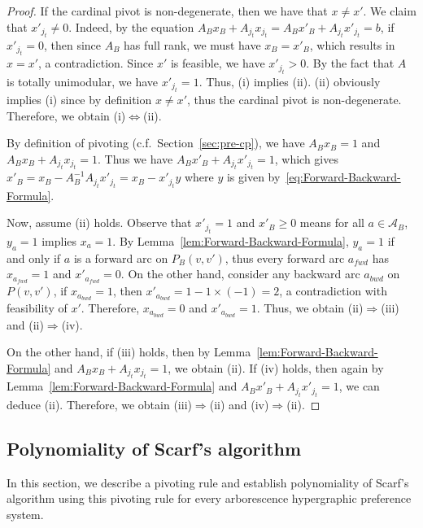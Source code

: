 \documentclass[11pt]{article}
\begin{document}
\begin{proof}
If the cardinal pivot is non-degenerate, then we have that $x\neq x'$. We claim that $x'_{j_t}\neq 0$. Indeed, by the equation $A_Bx_B+A_{j_t}x_{j_t}=A_Bx'_B+A_{j_t}x'_{j_t}=b$, if $x'_{j_t}=0$, then since $A_B$ has full rank, we must have $x_B=x'_B$, which results in $x=x'$, a contradiction. Since $x'$ is feasible, we have $x'_{j_t}>0$. By the fact that $A$ is totally unimodular, we have $x'_{j_t}=1$. Thus, (i) implies (ii). (ii) obviously implies (i) since by definition $x\neq x'$, thus the cardinal pivot is non-degenerate. Therefore, we obtain (i)$\Leftrightarrow$(ii).



By definition of pivoting (c.f.~Section~\ref{sec:pre-cp}), we have $A_Bx_B=1$ and $A_Bx_B+A_{j_t}x_{j_t}=1$. Thus we have $A_Bx'_B+A_{j_t}x'_{j_t}=1$, which gives $x'_B=x_B-A_B^{-1}A_{j_t}x'_{j_t}=x_B-x'_{j_t}y$ where $y$ is given by~\eqref{eq:Forward-Backward-Formula}. 

Now, assume (ii) holds. Observe that $x'_{j_t}=1$ and $x'_B\ge 0$ means for all $a\in\mathcal{A}_B$, $y_a=1$ implies $x_a=1$. By Lemma~\ref{lem:Forward-Backward-Formula}, $y_a=1$ if and only if $a$ is a forward arc on $P_B(v,v')$, thus every forward arc $a_{fwd}$ has $x_{a_{fwd}}=1$ and $x'_{a_{fwd}}=0$. On the other hand, consider any backward arc $a_{bwd}$ on $P(v,v')$, if $x_{a_{bwd}}=1$, then $x'_{a_{bwd}}=1-1\times(-1)=2$, a contradiction with feasibility of $x'$. Therefore, $x_{a_{bwd}}=0$ and $x'_{a_{bwd}}=1$. Thus, we obtain (ii)$\Rightarrow$(iii) and (ii)$\Rightarrow$(iv).

On the other hand, if (iii) holds, then by Lemma~\ref{lem:Forward-Backward-Formula} and $A_Bx_B+A_{j_t}x_{j_t}=1$, we obtain (ii). If (iv) holds, then again by Lemma~\ref{lem:Forward-Backward-Formula} and $A_Bx'_B+A_{j_t}x'_{j_t}=1$, we can deduce (ii). Therefore, we obtain (iii)$\Rightarrow$(ii) and (iv)$\Rightarrow$(ii).
\end{proof}









\subsection{Polynomiality of Scarf's algorithm}
In this section, we describe a pivoting rule and establish polynomiality of Scarf's algorithm using this pivoting rule for every arborescence hypergraphic preference system. 
\end{document}
